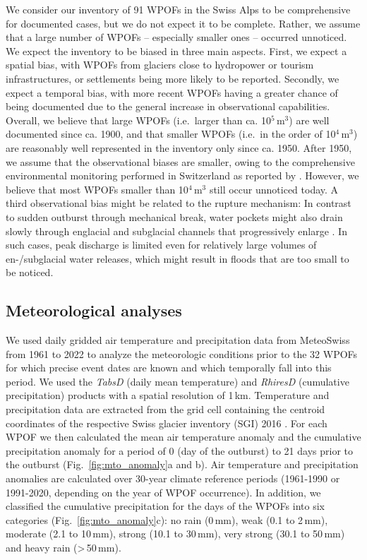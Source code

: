We consider our inventory of 91 WPOFs in the Swiss Alps to be comprehensive for documented cases, but we do not expect it to be complete. Rather, we assume that a large number of WPOFs -- especially smaller ones -- occurred unnoticed. We expect the inventory to be biased in three main aspects. First, we expect a spatial bias, with WPOFs from glaciers close to hydropower or tourism infrastructures, or settlements being more likely to be reported. Secondly, we expect a temporal bias, with more recent WPOFs having a greater chance of being documented due to the general increase in observational capabilities. Overall, we believe that large WPOFs (i.e.\ larger than ca. 10$^5$\,m$^3$) are well documented since ca. 1900, and that smaller WPOFs (i.e.\ in the order of 10$^4$\,m$^3$) are reasonably well represented in the inventory only since ca. 1950. After 1950, we assume that the observational biases are smaller, owing to the comprehensive environmental monitoring performed in Switzerland as reported by \cite{Zemp_WGMS2020}. However, we believe that most WPOFs smaller than 10$^4$\,m$^3$ still occur unnoticed today. A third observational bias might be related to the rupture mechanism: In contrast to sudden outburst through mechanical break, water pockets might also drain slowly through englacial and subglacial channels that progressively enlarge \citep{Nye1976}. In such cases, peak discharge is limited even for relatively large volumes of en-/subglacial water releases, which might result in floods that are too small to be noticed. 

\subsection{ Meteorological analyses}
\label{method_meteo}

We used daily gridded air temperature and precipitation data from MeteoSwiss from 1961 to 2022 \citep{MeteoSwiss2022} to analyze the meteorologic conditions prior to the 32 WPOFs for which precise event dates are known and which temporally fall into this period. We used the \textit{TabsD} (daily mean temperature) and \textit{RhiresD} (cumulative precipitation) products with a spatial resolution of 1\,km. Temperature and precipitation data are extracted from the grid cell containing the centroid coordinates of the respective Swiss glacier inventory (SGI) 2016 \citep{Linsbauer&al2021}. For each WPOF we then calculated the mean air temperature anomaly and the cumulative precipitation anomaly for a period of 0 (day of the outburst) to 21 days prior to the outburst (Fig.~\ref{fig:mto_anomaly}a and b). Air temperature and precipitation anomalies are calculated over 30-year climate reference periods (1961-1990 or 1991-2020, depending on the year of WPOF occurrence). In addition, we classified the cumulative precipitation for the days of the WPOFs into six categories (Fig.~\ref{fig:mto_anomaly}c): no rain (0\,mm), weak (0.1 to 2\,mm), moderate (2.1 to 10\,mm), strong (10.1 to 30\,mm), very strong (30.1 to 50\,mm) and heavy rain (>\,50\,mm).


